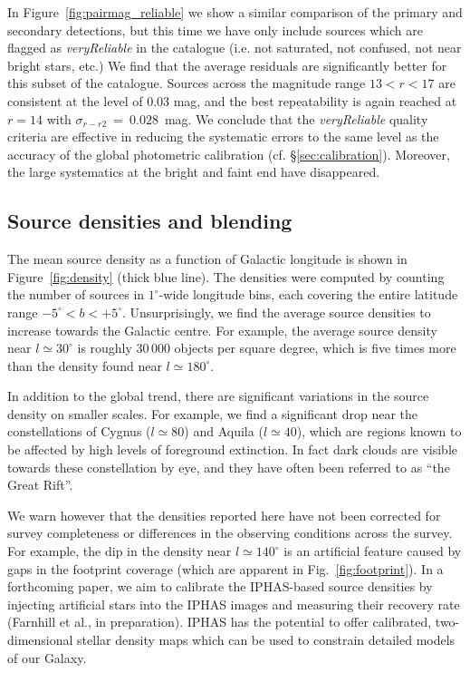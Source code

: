 \documentclass[useAMS,usenatbib]{mn2e}
\begin{document}
In Figure~\ref{fig:pairmag_reliable} we show 
a similar comparison of the primary and secondary detections,
but this time we have only include sources which are flagged
as \emph{veryReliable} in the catalogue
(i.e. not saturated, not confused, not near bright stars, etc.)
We find that the average residuals are significantly better
for this subset of the catalogue. Sources across the magnitude range 
$13 < r < 17$ are consistent at the level of 0.03 mag,
and the best repeatability is again reached at $r=14$
with $\sigma_{r-r2}~=~0.028$~mag.
We conclude that the \emph{veryReliable} quality criteria are effective
in reducing the systematic errors to
the same level as the accuracy of the
global photometric calibration (cf. \S\ref{sec:calibration}).
Moreover, the large systematics at the bright and faint end
have disappeared.

\subsection{Source densities and blending}
\label{sec:densities}

The mean source density as a function of Galactic longitude
is shown in Figure~\ref{fig:density} (thick blue line).
The densities were computed by counting the 
number of sources in $1^\circ$-wide longitude bins,
each covering the entire latitude range $-5^\circ<b<+5^\circ$.
Unsurprisingly, we find the average source densities to increase
towards the Galactic centre.
For example, the average source density near $l\simeq 30^\circ$
is roughly 30\,000 objects per square degree,
which is five times more than the density
found near $l\simeq 180^\circ$.

In addition to the global trend, 
there are significant variations
in the source density on smaller scales.
For example,  we find a significant drop near the constellations 
of Cygnus ($l\simeq 80$) and Aquila ($l\simeq 40$),
which are regions known to be affected
by high levels of foreground extinction.
In fact dark clouds are visible towards these constellation by eye,
and they have often been referred to as ``the Great Rift''.

We warn however that the densities reported here 
have not been corrected for survey completeness
or differences in the observing conditions across the survey.
For example, the dip in the density near $l\simeq140^\circ$
is an artificial feature caused by gaps
in the footprint coverage (which are apparent in Fig.~\ref{fig:footprint}).
In a forthcoming paper,
we aim to calibrate the IPHAS-based source densities
by injecting artificial stars into the IPHAS images
and measuring their recovery rate (Farnhill et al., in preparation).
IPHAS has the potential to offer
calibrated, two-dimensional stellar density maps
which can be used to constrain detailed models of our Galaxy.
\end{document}
